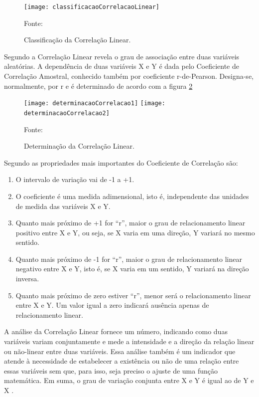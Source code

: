\graphicspath{{figuras/}}
\begin{figure}[H]
\centering
\texttt{[image: classificacaoCorrelacaoLinear]}
\caption{Classificação da Correlação Linear.}{Fonte: } 
\label{classificacaoCorrelacaoLinear}
\end{figure}

Segundo  a Correlação Linear revela o grau de associação entre duas variáveis aleatórias. A dependência de duas variáveis X e Y é dada pelo Coeficiente de Correlação Amostral, conhecido também por coeficiente r-de-Pearson. Designa-se, normalmente, por r e é determinado de acordo com a figura \ref{determinacaoCorrelacao}

\graphicspath{{figuras/}}
\begin{figure}[H]
\centering
\texttt{[image: determinacaoCorrelacao1]}
\texttt{[image: determinacaoCorrelacao2]}
\caption{Determinação da Correlação Linear.}{Fonte:  } 
\label{determinacaoCorrelacao}
\end{figure}

Segundo  as propriedades mais importantes do Coeficiente de Correlação são:

\begin{enumerate}
\item O intervalo de variação vai de -1 a +1.
\item O coeficiente é uma medida adimensional, isto é, independente das unidades de medida das variáveis X e Y.
\item  Quanto mais próximo de +1 for “r”, maior o grau de relacionamento linear positivo entre X e Y, ou seja, se X varia em uma direção, Y variará no mesmo sentido.
\item Quanto mais próximo de -1 for “r”, maior o grau de relacionamento linear negativo entre X e Y, isto é, se X varia em um sentido, Y variará na direção inversa.
\item Quanto mais próximo de zero estiver “r”, menor será o relacionamento linear entre X e Y. Um valor igual a zero indicará ausência apenas de relacionamento linear.
\end{enumerate}


A análise da Correlação Linear fornece um número, indicando como duas variáveis variam conjuntamente e mede a intensidade e a direção da relação linear ou não-linear entre duas variáveis. Essa análise também é um indicador que atende à necessidade de estabelecer a existência ou não de uma relação entre essas variáveis sem que, para isso, seja preciso o ajuste de uma função matemática. Em suma, o grau de variação conjunta entre X e Y é igual ao de Y e X \cite[p.~65]{lira2004}.

